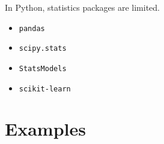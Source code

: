 \documentclass{beamer}
\begin{document}
{\begin{multicols}{2}
\begin{itemize}
\end{itemize}
\end{multicols}
\vspace{20pt}
In Python, statistics packages are limited.
\begin{multicols}{2}
\begin{itemize}
\item \texttt{pandas} %
\item \texttt{scipy.stats} %
\item \texttt{StatsModels} %
\item \texttt{scikit-learn} %
\end{itemize}
\end{multicols}

}


\section[Examples]{Examples}
\end{document}
